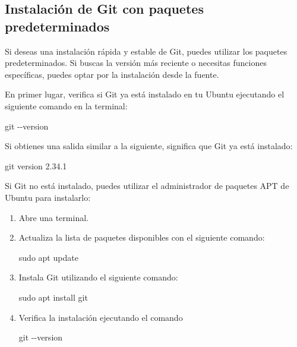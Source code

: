 \documentclass[
  a4paper,
]{article}
\newenvironment{Shaded}{}{}
\newcommand{\AttributeTok}[1]{\textcolor[rgb]{0.84,0.23,0.29}{#1}}
\newcommand{\FunctionTok}[1]{\textcolor[rgb]{0.44,0.26,0.76}{#1}}
\newcommand{\NormalTok}[1]{\textcolor[rgb]{0.14,0.16,0.18}{#1}}
\begin{document}
\subsection{Instalación de Git con paquetes
predeterminados}\label{instalaciuxf3n-de-git-con-paquetes-predeterminados}

Si deseas una instalación rápida y estable de Git, puedes utilizar los
paquetes predeterminados. Si buscas la versión más reciente o necesitas
funciones específicas, puedes optar por la instalación desde la fuente.

En primer lugar, verifica si Git ya está instalado en tu Ubuntu
ejecutando el siguiente comando en la terminal:

\begin{Shaded}
\begin{Highlighting}[]
\FunctionTok{git} \AttributeTok{{-}{-}version}
\end{Highlighting}
\end{Shaded}

Si obtienes una salida similar a la siguiente, significa que Git ya está
instalado:

\begin{Shaded}
\begin{Highlighting}[]
\FunctionTok{git}\NormalTok{ version 2.34.1}
\end{Highlighting}
\end{Shaded}

Si Git no está instalado, puedes utilizar el administrador de paquetes
APT de Ubuntu para instalarlo:

\begin{enumerate}
\def\labelenumi{\arabic{enumi}.}
\item
  Abre una terminal.
\item
  Actualiza la lista de paquetes disponibles con el siguiente comando:

\begin{Shaded}
\begin{Highlighting}[]
\FunctionTok{sudo}\NormalTok{ apt update}
\end{Highlighting}
\end{Shaded}
\item
  Instala Git utilizando el siguiente comando:

\begin{Shaded}
\begin{Highlighting}[]
\FunctionTok{sudo}\NormalTok{ apt install git}
\end{Highlighting}
\end{Shaded}
\item
  Verifica la instalación ejecutando el comando

\begin{Shaded}
\begin{Highlighting}[]
\FunctionTok{git} \AttributeTok{{-}{-}version}
\end{Highlighting}
\end{Shaded}
\end{enumerate}
\end{document}
